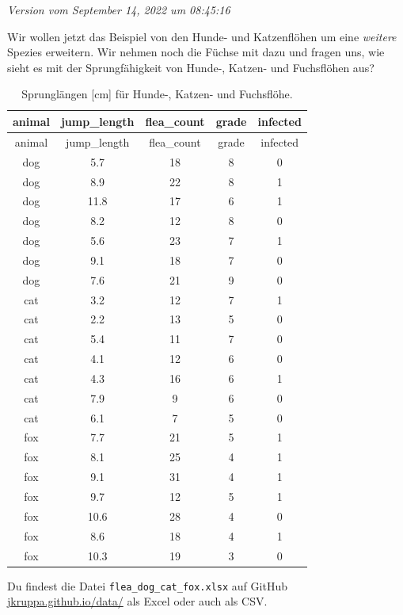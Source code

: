 \documentclass[
  letterpaper,
]{scrbook}
\begin{document}
\emph{Version vom September 14, 2022 um 08:45:16}

Wir wollen jetzt das Beispiel von den Hunde- und Katzenflöhen um eine
\emph{weitere} Spezies erweitern. Wir nehmen noch die Füchse mit dazu
und fragen uns, wie sieht es mit der Sprungfähigkeit von Hunde-, Katzen-
und Fuchsflöhen aus?

\hypertarget{tbl-dog-cat-fox}{}
\begin{longtable}[]{@{}ccccc@{}}
\caption{\label{tbl-dog-cat-fox}Sprunglängen {[}cm{]} für Hunde-,
Katzen- und Fuchsflöhe.}\tabularnewline
\toprule()
animal & jump\_length & flea\_count & grade & infected \\
\midrule()
\endfirsthead
\toprule()
animal & jump\_length & flea\_count & grade & infected \\
\midrule()
\endhead
dog & 5.7 & 18 & 8 & 0 \\
dog & 8.9 & 22 & 8 & 1 \\
dog & 11.8 & 17 & 6 & 1 \\
dog & 8.2 & 12 & 8 & 0 \\
dog & 5.6 & 23 & 7 & 1 \\
dog & 9.1 & 18 & 7 & 0 \\
dog & 7.6 & 21 & 9 & 0 \\
cat & 3.2 & 12 & 7 & 1 \\
cat & 2.2 & 13 & 5 & 0 \\
cat & 5.4 & 11 & 7 & 0 \\
cat & 4.1 & 12 & 6 & 0 \\
cat & 4.3 & 16 & 6 & 1 \\
cat & 7.9 & 9 & 6 & 0 \\
cat & 6.1 & 7 & 5 & 0 \\
fox & 7.7 & 21 & 5 & 1 \\
fox & 8.1 & 25 & 4 & 1 \\
fox & 9.1 & 31 & 4 & 1 \\
fox & 9.7 & 12 & 5 & 1 \\
fox & 10.6 & 28 & 4 & 0 \\
fox & 8.6 & 18 & 4 & 1 \\
fox & 10.3 & 19 & 3 & 0 \\
\bottomrule()
\end{longtable}

\begin{tcolorbox}[enhanced jigsaw, coltitle=black, titlerule=0mm, bottomrule=.15mm, opacityback=0, opacitybacktitle=0.6, leftrule=.75mm, title=\textcolor{quarto-callout-tip-color}{\faLightbulb}\hspace{0.5em}{Datei für von Flöhen auf Tieren}, toprule=.15mm, bottomtitle=1mm, toptitle=1mm, left=2mm, breakable, arc=.35mm, colback=white, rightrule=.15mm, colbacktitle=quarto-callout-tip-color!10!white, colframe=quarto-callout-tip-color-frame]
Du findest die Datei \texttt{flea\_dog\_cat\_fox.xlsx} auf GitHub
\href{https://github.com/jkruppa/jkruppa.github.io/tree/master/data}{jkruppa.github.io/data/}
als Excel oder auch als CSV.
\end{tcolorbox}
\end{document}
